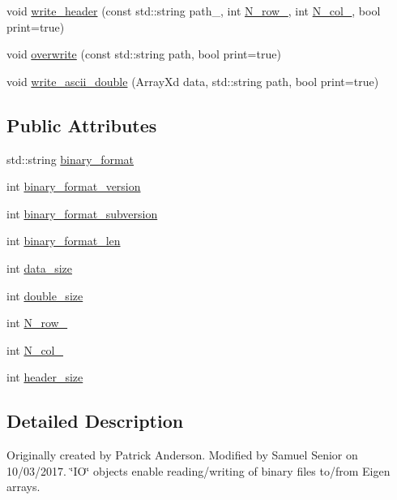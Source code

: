 \begin{DoxyCompactItemize}
\item 
void \hyperlink{class_i_o_a0db950886bb1e6d5571330f771974c4e}{write\+\_\+header} (const std\+::string path\+\_\+, int \hyperlink{class_i_o_ab8aa1490df2e2e758766030afdae3a40}{N\+\_\+row\+\_\+}, int \hyperlink{class_i_o_a64aae2d2be35348233f8ddac4d6791f2}{N\+\_\+col\+\_\+}, bool print=true)
\item 
void \hyperlink{class_i_o_a0fd7211866348cd3acc26d1ed17c100c}{overwrite} (const std\+::string path, bool print=true)
\item 
void \hyperlink{class_i_o_a20602422f0a6615b265c96fc02523e6f}{write\+\_\+ascii\+\_\+double} (Array\+Xd data, std\+::string path, bool print=true)
\end{DoxyCompactItemize}
\subsection*{Public Attributes}
\begin{DoxyCompactItemize}
\item 
std\+::string \hyperlink{class_i_o_a254c13a437051a09be72f77173017576}{binary\+\_\+format}
\item 
int \hyperlink{class_i_o_aaf91ba1d8be1503b44b2b1b1b666303b}{binary\+\_\+format\+\_\+version}
\item 
int \hyperlink{class_i_o_ad5c0c344b35565bb355c5d714121787b}{binary\+\_\+format\+\_\+subversion}
\item 
int \hyperlink{class_i_o_a2a1699a4cde1ce8631ae0309bc75d336}{binary\+\_\+format\+\_\+len}
\item 
int \hyperlink{class_i_o_a39a8a0474a288522d847f6be0fb2403f}{data\+\_\+size}
\item 
int \hyperlink{class_i_o_a3af3bf77eacd18c1c50cbf78b46c4228}{double\+\_\+size}
\item 
int \hyperlink{class_i_o_ab8aa1490df2e2e758766030afdae3a40}{N\+\_\+row\+\_\+}
\item 
int \hyperlink{class_i_o_a64aae2d2be35348233f8ddac4d6791f2}{N\+\_\+col\+\_\+}
\item 
int \hyperlink{class_i_o_aee540c40b18d5f9990bf8d7e12cb0827}{header\+\_\+size}
\end{DoxyCompactItemize}


\subsection{Detailed Description}
Originally created by Patrick Anderson. Modified by Samuel Senior on 10/03/2017. \char`\"{}\+I\+O\char`\"{} objects enable reading/writing of binary files to/from Eigen arrays. 

